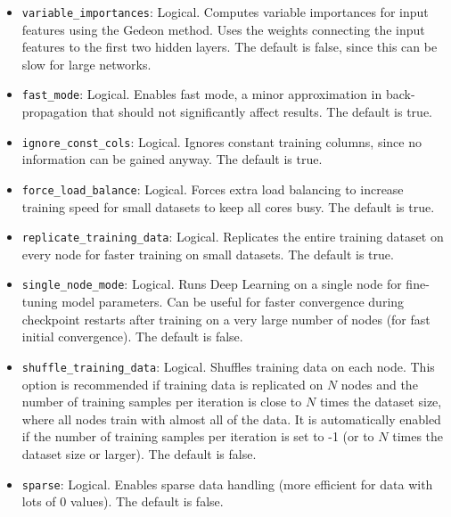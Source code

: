 {{{\begin{itemize}

\item \texttt{variable\_importances}: Logical. Computes variable importances for input features using the Gedeon method. Uses the weights connecting the input features to the first two hidden layers. The default is false, since this can be slow for large networks. 

\item \texttt{fast\_mode}: Logical. Enables fast mode, a minor approximation in back-propagation that should not significantly affect results. The default is true.

\item \texttt{ignore\_const\_cols}: Logical. Ignores constant training columns, since no information can be gained anyway.  The default is true.

\item \texttt{force\_load\_balance}:  Logical. Forces extra load balancing to increase training speed for small datasets to keep all cores busy. The default is true.

\item \texttt{replicate\_training\_data}:  Logical. Replicates the entire training dataset on every node for faster training on small datasets. The default is true.

\item \texttt{single\_node\_mode}:  Logical. Runs Deep Learning on a single node for fine-tuning model parameters. Can be useful for faster convergence during checkpoint restarts after training on a very large number of nodes (for fast initial convergence). The default is false.

\item \texttt{shuffle\_training\_data}: Logical. Shuffles training data on each node. This option is recommended if training data is replicated on $N$ nodes and the number of training samples per iteration is close to $N$ times the dataset size, where all nodes train with almost all of the data. It is automatically enabled if the number of training samples per iteration is set to -1 (or to $N$ times the dataset size or larger).  The default is false.

\item \texttt{sparse}: Logical. Enables sparse data handling (more efficient for data with lots of 0 values).
The default is false.


\end{itemize}}}}
